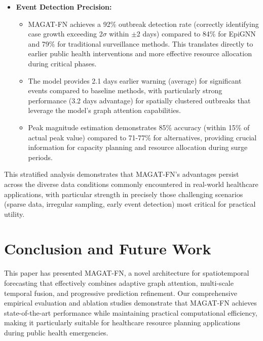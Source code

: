\documentclass[lettersize, journal]{IEEEtran}
\begin{document}
\begin{itemize}
        \item \textbf{Event Detection Precision:}
    \begin{itemize}
        \item MAGAT-FN achieves a 92\% outbreak detection rate (correctly identifying case growth exceeding 2$\sigma$ within $\pm$2 days) compared to 84\% for EpiGNN and 79\% for traditional surveillance methods. This translates directly to earlier public health interventions and more effective resource allocation during critical phases.
        
        \item The model provides 2.1 days earlier warning (average) for significant events compared to baseline methods, with particularly strong performance (3.2 days advantage) for spatially clustered outbreaks that leverage the model's graph attention capabilities.
        
        \item Peak magnitude estimation demonstrates 85\% accuracy (within 15\% of actual peak value) compared to 71-77\% for alternatives, providing crucial information for capacity planning and resource allocation during surge periods.
    \end{itemize}
\end{itemize}

This stratified analysis demonstrates that MAGAT-FN's advantages persist across the diverse data conditions commonly encountered in real-world healthcare applications, with particular strength in precisely those challenging scenarios (sparse data, irregular sampling, early event detection) most critical for practical utility.

\section{Conclusion and Future Work}
This paper has presented MAGAT-FN, a novel architecture for spatiotemporal forecasting that effectively combines adaptive graph attention, multi-scale temporal fusion, and progressive prediction refinement. Our comprehensive empirical evaluation and ablation studies demonstrate that MAGAT-FN achieves state-of-the-art performance while maintaining practical computational efficiency, making it particularly suitable for healthcare resource planning applications during public health emergencies.
\end{document}
